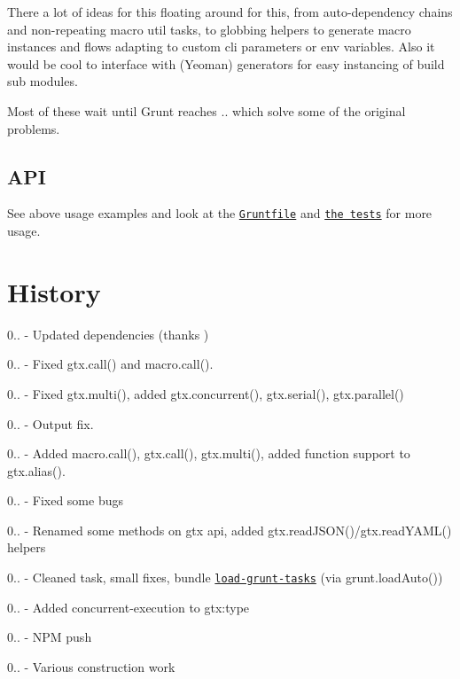 There a lot of ideas for this floating around for this, from auto-\/dependency chains and non-\/repeating macro util tasks, to globbing helpers to generate macro instances and flows adapting to custom cli parameters or env variables. Also it would be cool to interface with (Yeoman) generators for easy instancing of build sub modules.

Most of these wait until Grunt reaches {..} which solve some of the original problems.

\subsection*{A\+PI}

See above usage examples and look at the \href{https://github.com/Bartvds/gruntfile-gtx/blob/master/Gruntfile.js}{\tt Gruntfile} and \href{https://github.com/Bartvds/gruntfile-gtx/tree/master/test/spec}{\tt the tests} for more usage.

\section*{History}


\begin{DoxyItemize}
\item 0.. -\/ Updated dependencies (thanks )
\item 0.. -\/ Fixed {\ttfamily gtx.\+call()} and {\ttfamily macro.\+call()}.
\item 0.. -\/ Fixed {\ttfamily gtx.\+multi()}, added {\ttfamily gtx.\+concurrent()}, {\ttfamily gtx.\+serial()}, {\ttfamily gtx.\+parallel()}
\item 0.. -\/ Output fix.
\item 0.. -\/ Added {\ttfamily macro.\+call()}, {\ttfamily gtx.\+call()}, {\ttfamily gtx.\+multi()}, added function support to {\ttfamily gtx.\+alias()}.
\item 0.. -\/ Fixed some bugs
\item 0.. -\/ Renamed some methods on {\ttfamily gtx} api, added {\ttfamily gtx.\+read\+J\+S\+O\+N()}/{\ttfamily gtx.\+read\+Y\+A\+M\+L()} helpers
\item 0.. -\/ Cleaned task, small fixes, bundle \href{https://github.com/sindresorhus/load-grunt-tasks}{\tt load-\/grunt-\/tasks} (via {\ttfamily grunt.\+load\+Auto()})
\item 0.. -\/ Added concurrent-\/execution to {\ttfamily gtx\+:type}
\item 0.. -\/ N\+PM push
\item 0.. -\/ Various construction work
\end{DoxyItemize}


